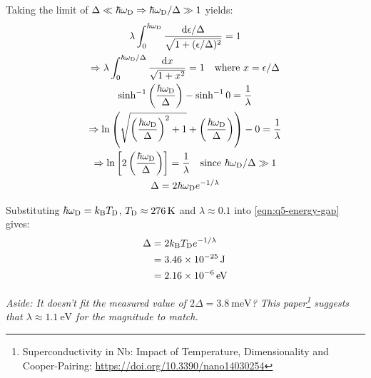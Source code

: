 \begin{parts}
\begin{subparts}
		Taking the limit of $\Delta \ll \hbar\omega_\textnormal{D} \Rightarrow \hbar\omega_\textnormal{D} / \Delta \gg 1$ yields:
		\begin{gather}
			\lambda \int_{0}^{\hbar\omega_\textnormal{D}} \frac{\mathrm{d}\epsilon / \Delta}{\sqrt{1 + (\epsilon/\Delta)^2}} = 1 \notag \\
			\Rightarrow \lambda \int_{0}^{\hbar\omega_\textnormal{D} / \Delta} \frac{\mathrm{d}x}{\sqrt{1+x^2}} = 1 \textnormal{\hspace{1em}where $x=\epsilon/\Delta$} \notag \\
			\sinh^{-1} \left(\frac{\hbar\omega_\textnormal{D}}{\Delta}\right) - \sinh^{-1} 0 = \frac{1}{\lambda} \notag \\
			\Rightarrow \ln \left(\sqrt{\left(\frac{\hbar\omega_\textnormal{D}}{\Delta}\right)^2 + 1} + \left(\frac{\hbar\omega_\textnormal{D}}{\Delta}\right)\right) - 0 = \frac{1}{\lambda} \notag \\
			\Rightarrow \ln \left[ 2 \left(\frac{\hbar\omega_\textnormal{D}}{\Delta}\right) \right] = \frac{1}{\lambda} \textnormal{\hspace{1em}since $\hbar\omega_\textnormal{D} / \Delta \gg 1$} \notag \\
			\Delta = 2\hbar\omega_\textnormal{D} e^{-1/\lambda}
			\label{eqn:q5-energy-gap}
		\end{gather}
		
		\subpart Substituting $\hbar\omega_\textnormal{D} = k_\textnormal{B}T_\textnormal{D}$, $T_\textnormal{D} \approx \SI{276}{\kelvin}$ and $\lambda \approx 0.1$ into \eqref{eqn:q5-energy-gap} gives:
		\begin{align*}
			\Delta &= 2k_\textnormal{B}T_\textnormal{D} e^{-1/\lambda} \\
			&= \SI{3.46e-25}{\joule} \\
			&= \SI{2.16e-6}{\electronvolt}
		\end{align*}
		
		\textit{Aside: It doesn't fit the measured value of $2\Delta = \SI{3.8}{\milli\electronvolt}$? This paper\footnote{Superconductivity in Nb: Impact of Temperature, Dimensionality and Cooper-Pairing: \url{https://doi.org/10.3390/nano14030254}} suggests that $\lambda \approx \SI{1.1}{\electronvolt}$ for the magnitude to match.}
	\end{subparts}
\end{parts}